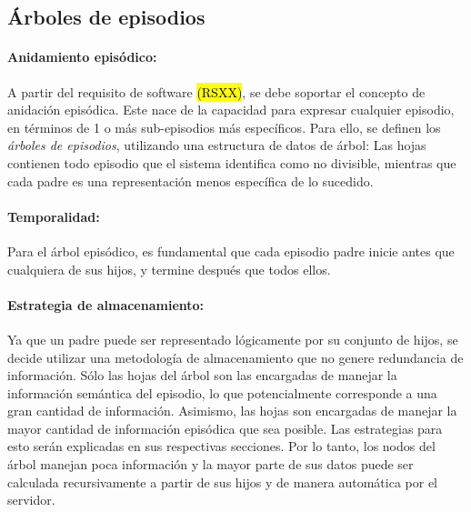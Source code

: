  
\subsection{Árboles de episodios}



\paragraph{Anidamiento episódico:}
A partir del requisito de software \hl{(RSXX)}, se debe soportar el concepto de anidación episódica. Este nace de la capacidad para expresar cualquier episodio, en términos de 1 o más sub-episodios más específicos. Para ello, se definen los \textit{árboles de episodios}, utilizando una estructura de datos de árbol: Las hojas contienen todo episodio que el sistema identifica como no divisible, mientras que cada padre es una representación menos específica de lo sucedido.

\paragraph{Temporalidad:}
Para el árbol episódico, es fundamental que cada episodio padre inicie antes que cualquiera de sus hijos, y termine después que todos ellos. 

\paragraph{Estrategia de almacenamiento:}
Ya que un padre puede ser representado lógicamente por su conjunto de hijos, se decide utilizar una metodología de almacenamiento que no genere redundancia de información. Sólo las hojas del árbol son las encargadas de manejar la información semántica del episodio, lo que potencialmente corresponde a una gran cantidad de información. Asimismo, las hojas son encargadas de manejar la mayor cantidad de información episódica que sea posible. Las estrategias para esto serán explicadas en sus respectivas secciones. Por lo tanto, los nodos del árbol manejan poca información y la mayor parte de sus datos puede ser calculada recursivamente a partir de sus hijos y de manera automática por el servidor.

